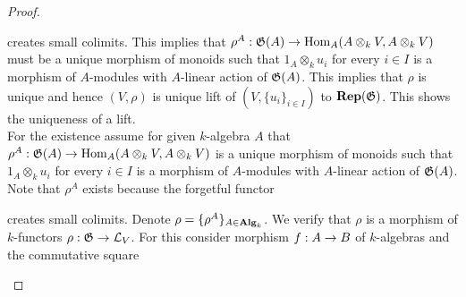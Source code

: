 \begin{proof}
\begin{center}
\end{center}
creates small colimits. This implies that $\rho^A:{\mathfrak G}(A) \rightarrow \mathrm{Hom}_A(A\otimes_kV,A\otimes_kV)$ must be a unique morphism of monoids such that $1_A\otimes_ku_i$ for every $i\in I$ is a morphism of $A$-modules with $A$-linear action of ${\mathfrak G}(A)$. This implies that $\rho$ is unique and hence $(V,\rho)$ is unique lift of $\left(V,\{u_i\}_{i\in I}\right)$ to $\mathbf{Rep}({\mathfrak G})$. This shows the uniqueness of a lift.\\
For the existence assume for given $k$-algebra $A$ that $\rho^A:{\mathfrak G}(A) \rightarrow \mathrm{Hom}_A(A\otimes_kV,A\otimes_kV)$ is a unique morphism of monoids such that $1_A\otimes_ku_i$ for every $i\in I$ is a morphism of $A$-modules with $A$-linear action of ${\mathfrak G}(A)$. Note that $\rho^A$ exists because the forgetful functor
\begin{center}
\end{center}
creates small colimits. Denote $\rho = \{\rho^A\}_{A\in \mathbf{Alg}_k}$. We verify that $\rho$ is a morphism of $k$-functors $\rho:{\mathfrak G}\rightarrow {\mathcal L}_V$. For this consider morphism $f:A\rightarrow B$ of $k$-algebras and the commutative square
\begin{center}
\end{center}
\end{proof}
